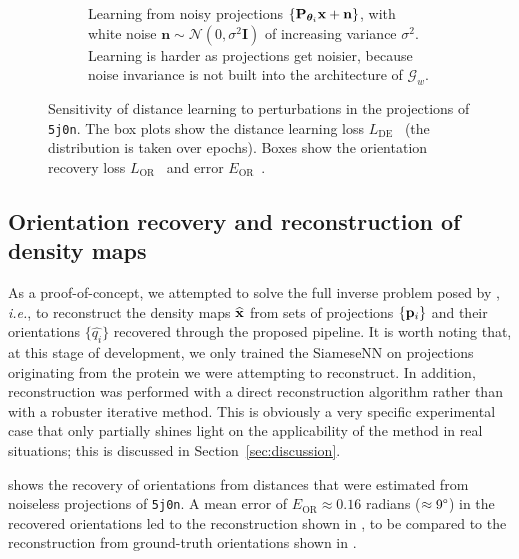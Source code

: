 \begin{figure}[ht!]
\begin{subfigure}[t]{0.47\linewidth}
        \caption{%
            Learning from noisy projections $\{ \mathbf{P}_{{\boldsymbol{\theta}}_i} \mathbf{x} + \mathbf{n} \}$, with white noise $\mathbf{n} \sim \mathcal{N}(0, \sigma^2\mathbf{I})$ of increasing variance $\sigma^2$.
            Learning is harder as projections get noisier, because noise invariance is not built into the architecture of $\mathcal{G}_w$.
        }\label{fig:results:distance-estimation:noise}
    \end{subfigure}
    \caption{%
        Sensitivity of distance learning to perturbations in the projections of \texttt{5j0n}.
        The box plots show the distance learning loss $L_\text{DE}$~ (the distribution is taken over epochs).
        Boxes show the orientation recovery loss $L_\text{OR}$~ and error $E_\text{OR}$~.
    }\label{fig:results:distance-estimation}
\end{figure}


\subsection{Orientation recovery and reconstruction of density maps}\label{sec:results:orientation-recovery:reconstruction}

As a proof-of-concept, we attempted to solve the full inverse problem posed by , \textit{i.e.}, to reconstruct the density maps $\widehat{\mathbf{x}}$ from sets of projections $\{ \mathbf{p}_i \}$ and their orientations $\{ \widehat{q_i} \}$ recovered through the proposed pipeline.
It is worth noting that, at this stage of development, we only trained the SiameseNN on projections originating from the protein we were attempting to reconstruct. In addition, reconstruction was performed with a direct reconstruction algorithm rather than with a robuster iterative method. This is obviously a very specific experimental case that only partially shines light on the applicability of the method in real situations; this is discussed in Section~\ref{sec:discussion}.

 shows the recovery of orientations from distances that were estimated from noiseless projections of \texttt{5j0n}.
A mean error of $E_\text{OR} \approx 0.16$ radians ($\approx 9\degree$) in the recovered orientations led to the reconstruction shown in , to be compared to the reconstruction from ground-truth orientations shown in .

